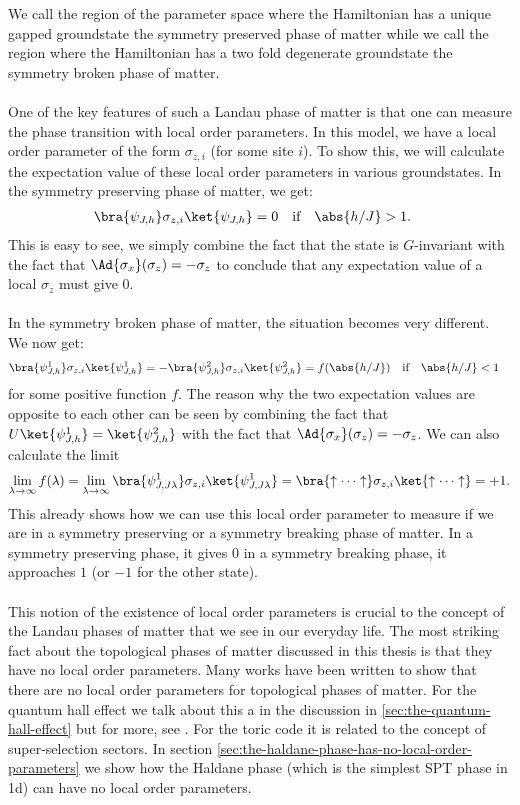 We call the region of the parameter space where the Hamiltonian has a unique gapped groundstate the symmetry preserved phase of matter while we call the region where the Hamiltonian has a two fold degenerate groundstate the symmetry broken phase of matter.\\\\
One of the key features of such a Landau phase of matter is that one can measure the phase transition with local order parameters. In this model, we have a local order parameter of the form $\sigma_{z,i}$ (for some site $i$). To show this, we will calculate the expectation value of these local order parameters in various groundstates. In the symmetry preserving phase of matter, we get:
\begin{align}
	\bra{\psi_{J,h}}\sigma_{z,i} \ket{\psi_{J,h}}&=0&&\text{if}&\abs{h/J}&>1.
\end{align}
This is easy to see, we simply combine the fact that the state is $G$-invariant with the fact that $\Ad{\sigma_x}(\sigma_z)=-\sigma_z$ to conclude that any expectation value of a local $\sigma_z$ must give 0.
\\\\
In the symmetry broken phase of matter, the situation becomes very different. We now get:
\begin{align}
\bra{\psi_{J,h}^1}\sigma_{z,i} \ket{\psi_{J,h}^1}&=-\bra{\psi_{J,h}^2}\sigma_{z,i} \ket{\psi_{J,h}^2}=f(\abs{h/J})&&\text{if}&\abs{h/J}&<1
\end{align}
for some positive function $f$. The reason why the two expectation values are opposite to each other can be seen by combining the fact that $U\ket{\psi_{J,h}^1}=\ket{\psi_{J,h}^2}$ with the fact that $\Ad{\sigma_x}(\sigma_z)=-\sigma_z$. We can also calculate the limit
\begin{equation}
	\lim_{\lambda\rightarrow\infty}f(\lambda)=\lim_{\lambda\rightarrow\infty}\bra{\psi_{J,J\lambda}^1}\sigma_{z,i} \ket{\psi_{J,J\lambda}^1}=\bra{\uparrow\cdots\uparrow}\sigma_{z,i}\ket{\uparrow\cdots\uparrow}=+1.
\end{equation}
This already shows how we can use this local order parameter to measure if we are in a symmetry preserving or a symmetry breaking phase of matter. In a symmetry preserving phase, it gives 0 in a symmetry breaking phase, it approaches $1$ (or $-1$ for the other state).
\\\\
This notion of the existence of local order parameters is crucial to the concept of the Landau phases of matter that we see in our everyday life. The most striking fact about the topological phases of matter discussed in this thesis is that they have no local order parameters. Many works have been written to show that there are no local order parameters for topological phases of matter. For the quantum hall effect we talk about this a in the discussion in \ref{sec:the-quantum-hall-effect} but for more, see \cite{tong2016lectures}. For the toric code it is related to the concept of super-selection sectors. In section \ref{sec:the-haldane-phase-has-no-local-order-parameters} we show how the Haldane phase (which is the simplest SPT phase in 1d) can have no local order parameters.
